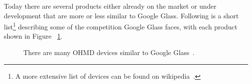 Today there are several products either already on the market or under development that are more or less similar to Google Glass. Following is a short list\footnote{A more extensive list of devices can be found on wikipedia~\cite{ohmdWiki}.} describing some of the competition Google Glass faces, with each product shown in Figure ~\ref{imagesSimilarProducts}. 

	\begin{figure}[ht!]
		\centering
    \qquad
    \qquad
    \qquad
    \qquad
		\caption{There are many OHMD devices similar to Google Glass~\cite{ohmdWiki}.}
		\label{imagesSimilarProducts}
	\end{figure}
	

